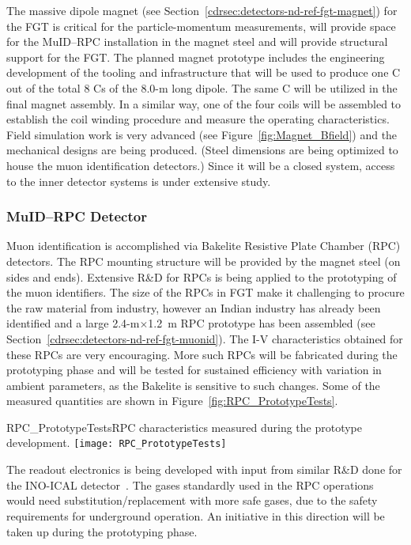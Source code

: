 The massive dipole magnet (see Section~\ref{cdrsec:detectors-nd-ref-fgt-magnet}) for the FGT 
is critical for the particle-momentum measurements, will 
provide space for the MuID--RPC installation in the magnet steel
and will provide structural support for the FGT. 
The planned magnet prototype
includes the engineering development of the tooling and
infrastructure 
that will be used to produce one C out of the total 8 Cs of the
8.0-m long dipole.  The same C will be utilized in the final magnet
assembly. In a similar way, one of the four coils
will be assembled to establish the coil winding procedure and measure the
operating characteristics.  Field simulation work is very
advanced (see Figure~\ref{fig:Magnet_Bfield}) and the mechanical
designs are being produced.  (Steel dimensions are being optimized to house the muon
identification detectors.) Since it will be a
closed system, access to the inner detector systems is under extensive
study.


\subsubsection{MuID--RPC Detector}

Muon identification is accomplished via Bakelite Resistive Plate
Chamber (RPC) detectors.  The RPC mounting structure will be provided
by the magnet steel (on sides and ends).  Extensive R\&D for RPCs is
being applied to the prototyping of the muon identifiers. The size of
the RPCs in FGT make it challenging to procure the raw material from
industry, however an Indian industry has already been identified and a
large 2.4-m$\times$1.2~m RPC prototype has been assembled (see
Section~\ref{cdrsec:detectors-nd-ref-fgt-muonid}). The I-V
characteristics obtained for these RPCs are very encouraging. More
such RPCs will be fabricated during the prototyping phase and will be
tested for sustained efficiency with variation in ambient parameters,
as the Bakelite is sensitive to such changes. Some of the measured
quantities are shown in Figure~\ref{fig:RPC_PrototypeTests}.  
\begin{cdrfigure}
{RPC_PrototypeTests}{RPC characteristics measured during the prototype development.}
\texttt{[image: RPC\_PrototypeTests]}
\end{cdrfigure}
The readout electronics is being developed with input from similar
R\&D done for the INO-ICAL detector~\cite{1748-0221-7-10-P10003}. The
gases standardly used in the RPC operations would need
substitution/replacement with more safe gases, due to the safety
requirements for underground operation.  An initiative in this
direction will be taken up during the prototyping phase.



